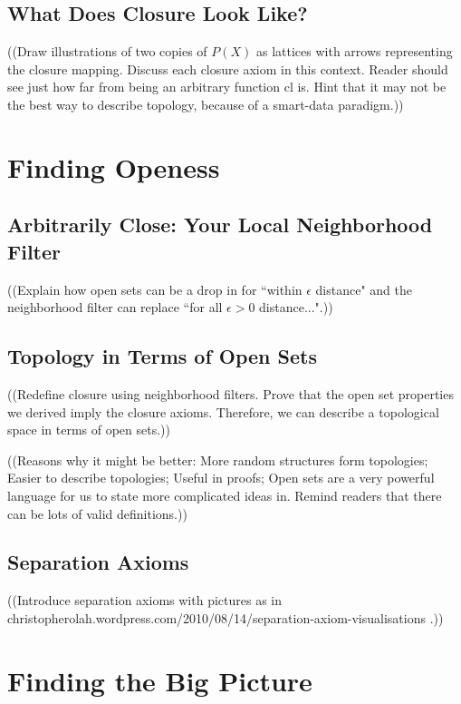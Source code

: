 \documentclass{report}
\newcommand{\cl}{\mathrm{cl}}
\begin{document}
\section{What Does Closure Look Like?}

((Draw illustrations of two copies of $P(X)$ as lattices with arrows representing the closure mapping. Discuss each closure axiom in this context. Reader should see just how far from being an arbitrary function $\cl$ is. Hint that it may not be the best way to describe topology, because of a smart-data paradigm.))

\chapter{Finding Openess}

\section{Arbitrarily Close: Your Local Neighborhood Filter}

((Explain how open sets can be a drop in for ``within $\epsilon$ distance" and the neighborhood filter can replace ``for all $\epsilon > 0$ distance...".))

\section{Topology in Terms of Open Sets}

((Redefine closure using neighborhood filters. Prove that the open set properties we derived imply the closure axioms. Therefore, we can describe a topological space in terms of open sets.))

((Reasons why it might be better: More random structures form topologies; Easier to describe topologies; Useful in proofs; Open sets are a very powerful language for us to state more complicated ideas in. Remind readers that there can be lots of valid definitions.))

\section{Separation Axioms}

((Introduce separation axioms with pictures as in\\ christopherolah.wordpress.com/2010/08/14/separation-axiom-visualisations .))

\chapter{Finding the Big Picture}
\end{document}
